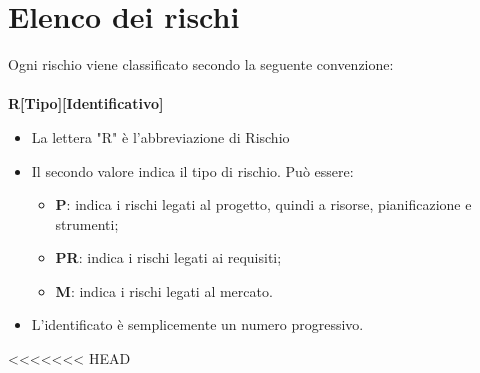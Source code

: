 \section{Elenco dei rischi}
Ogni rischio viene classificato secondo la seguente convenzione:\\\\
\centering \textbf{R[Tipo][Identificativo]}\\
\begin{itemize}
	\item La lettera "R" è l'abbreviazione di Rischio
	\item Il secondo valore indica il tipo di rischio. Può essere:
	\begin{itemize}
		\item \textbf{P}: indica i rischi legati al progetto, quindi a risorse, pianificazione e strumenti;
		\item \textbf{PR}: indica i rischi legati ai requisiti;
		\item \textbf{M}: indica i rischi legati al mercato.
	\end{itemize}
	\item L'identificato è semplicemente un numero progressivo.
\end{itemize}
<<<<<<< HEAD
